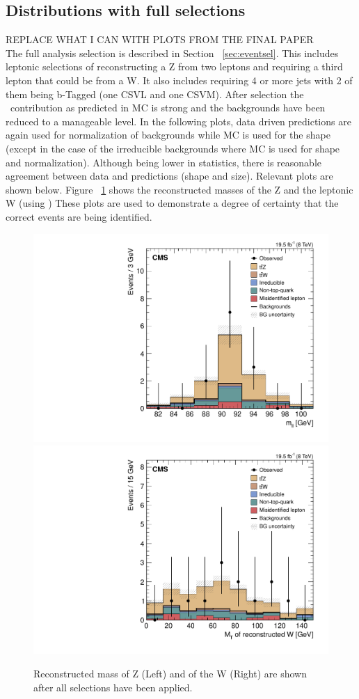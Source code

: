 	\subsection{Distributions with full selections}
	REPLACE WHAT I CAN WITH PLOTS FROM THE FINAL PAPER\\
	
	
	The full analysis selection is described in Section ~\ref{sec:eventsel}. This includes leptonic selections of reconstructing a Z from two leptons and requiring a third lepton that could be from a W. It also includes requiring 4 or more jets with 2 of them being b-Tagged (one CSVL and one CSVM). After selection the \ttZ \ contribution as predicted in MC is strong and the backgrounds have been reduced to a manageable level. In the following plots, data driven predictions are again used for normalization of backgrounds while MC is used for the shape (except in the case of the irreducible backgrounds where MC is used for shape and normalization). Although being lower in statistics, there is reasonable agreement between data and predictions (shape and size). Relevant plots are shown below. Figure ~\ref{fig:hmass_3l2j2b} shows the reconstructed masses of the Z and the leptonic W (using \Mt) %
These plots are used to demonstrate a degree of certainty that the correct events are being identified. %

\begin{figure}[h]
\begin{center}
\includegraphics[width=0.48\linewidth]{Figs/Plots_Final_Selections/hZMass_3L2J2b.pdf}
\includegraphics[width=0.48\linewidth]{Figs/Plots_Final_Selections/hWMt_3L2J2b.pdf}
\caption{\label{fig:hmass_3l2j2b}
Reconstructed mass of Z (Left) and \Mt of the W (Right) are shown after all selections have been applied.
}
\end{center}
\end{figure}


